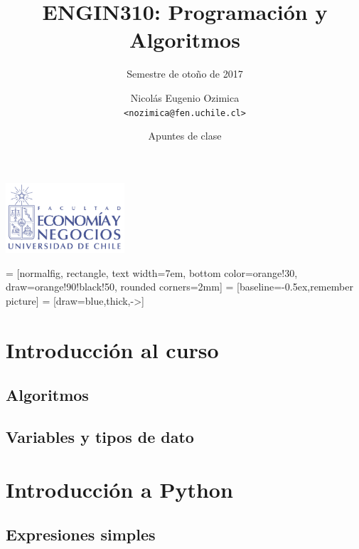 \documentclass[12pt,xcolor={dvipsnames,x11names},t,table]{beamer}
\title{ENGIN310: Programación y Algoritmos}
\subtitle{Semestre de otoño de 2017}
\author{Nicolás Eugenio Ozimica\\[.4em]\texttt{<nozimica@fen.uchile.cl>}}
\date{Apuntes de clase}
\begin{document}
\begin{frame}[plain]
    \centering \includegraphics[height=26mm]{img/logoFen.png}\\
    \centering
    \titlepage
\end{frame}

\def\opacityblock{.3}

 = [normalfig, rectangle, text width=7em, bottom color=orange!30, draw=orange!90!black!50, rounded corners=2mm]
 = [baseline=-0.5ex,remember picture]
 = [draw=blue,thick,->]

\def\tightlist{}




\section{Introducción al curso}

\subsection{Algoritmos}


\subsection{Variables y tipos de dato}


\section{Introducción a Python}

\subsection{Expresiones simples}

\end{document}
